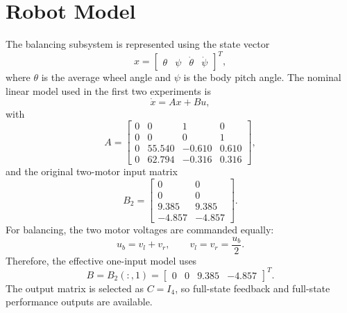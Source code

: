 \documentclass[conference]{IEEEtran}
\begin{document}
\section{Robot Model}
The balancing subsystem is represented using the state vector
\begin{equation}
x=\begin{bmatrix}\theta & \psi & \dot{\theta} & \dot{\psi}\end{bmatrix}^T,
\end{equation}
where $\theta$ is the average wheel angle and $\psi$ is the body pitch angle. The nominal linear model used in the first two experiments is
\begin{equation}
\dot{x}=Ax+Bu,
\end{equation}
with
\begin{equation}
A=
\begin{bmatrix}
0 & 0 & 1 & 0\\
0 & 0 & 0 & 1\\
0 & 55.540 & -0.610 & 0.610\\
0 & 62.794 & -0.316 & 0.316
\end{bmatrix},
\end{equation}
and the original two-motor input matrix
\begin{equation}
B_2=
\begin{bmatrix}
0 & 0\\
0 & 0\\
9.385 & 9.385\\
-4.857 & -4.857
\end{bmatrix}.
\end{equation}
For balancing, the two motor voltages are commanded equally:
\begin{equation}
u_b=v_l+v_r,\qquad v_l=v_r=\frac{u_b}{2}.
\end{equation}
Therefore, the effective one-input model uses
\begin{equation}
B=B_2(:,1)=
\begin{bmatrix}
0 & 0 & 9.385 & -4.857
\end{bmatrix}^T.
\end{equation}
The output matrix is selected as $C=I_4$, so full-state feedback and full-state performance outputs are available.
\end{document}
